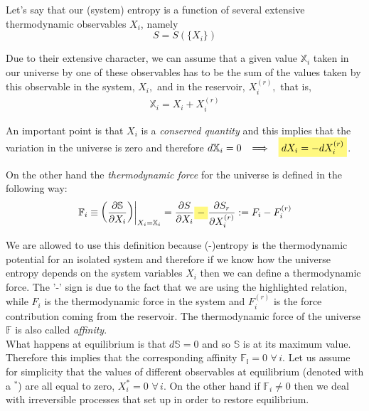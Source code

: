 \documentclass[\main/main.tex]{subfiles}
\begin{document}
Let's say that our (system) entropy is a function of several extensive thermodynamic observables $X_i$, namely
\begin{equation}
    S=S(\{X_i\})
\end{equation}

Due to their extensive character, we can assume that a given value $\mathbb{X}_{i}$ taken in our universe by one of these observables has to be the sum of the values taken by this observable in the system, $X_{i},$ and in the reservoir, $X_{i}^{(r)},$ that is,
\begin{align}
  \mathbb{X}_{i}=X_{i}+X_{i}^{(r)}  
\end{align}

An important point is that $X_i$ is a \textit{conserved quantity} and this implies that the variation in the universe is zero and therefore $d\mathbb{X}_i=0\,\,\, \implies\,\,\, \hlc{yellow}{dX_i=-dX_i^{(r)}}$.

On the other hand the \textit{thermodynamic force} for the universe is defined in the following way:
\begin{equation}
    \left.\mathbb{F}_{i} \equiv\left(\frac{\partial \mathbb{S}}{\partial X_{i}}\right)\right|_{X_{i}=\mathbb{X}_{i}}=\frac{\partial S}{\partial X_{i}}\hlc{yellow}{-}\frac{\partial S_{r}}{\partial X_{i}^{(r)}} := F_{i}-F_{i}^{(r)}
\end{equation}

We are allowed to use this definition because (-)entropy is the thermodynamic potential for an isolated system and therefore if we know how the universe entropy depends on the system variables $X_i$ then we can define a thermodynamic force. The '-' sign is due to the fact that we are using the highlighted relation, while $F_i$ is the thermodynamic force in the system and $F_i^{(r)}$ is the force contribution coming from the reservoir. The thermodynamic force of the universe $\mathbb{F}$ is also called \textit{affinity}. \\

What happens at equilibrium is that $d\mathbb{S}=0$ and so $\mathbb{S}$ is at its maximum value. Therefore this implies that the corresponding affinity $\mathbb{F_i}=0\,\, \forall\, i$. Let us assume for simplicity that the values of different observables at equilibrium (denoted with a $^*$) are all equal to zero, $X_i^*=0\,\,\forall \,i$. On the other hand if $\mathbb{F}_i\neq 0$ then we deal with irreversible processes that set up in order to restore equilibrium. \\
\end{document}
